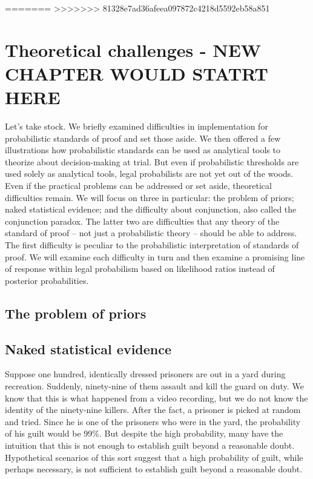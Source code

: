 \documentclass[10pt,dvipsnames,enabledeprecatedfontcommands]{scrartcl}
\begin{document}
=======
>>>>>>> 81328e7ad36afeea097872c4218d5592eb58a851
\hypertarget{theoretical-challenges---new-chapter-would-statrt-here}{%
\section{Theoretical challenges - NEW CHAPTER WOULD STATRT
HERE}\label{theoretical-challenges---new-chapter-would-statrt-here}}

Let's take stock. We briefly examined difficulties in implementation for
probabilistic standards of proof and set those aside. We then offered a
few illustrations how probabilistic standards can be used as analytical
tools to theorize about decision-making at trial. But even if
probabilistic thresholds are used solely as analytical tools, legal
probabilists are not yet out of the woods. Even if the practical
problems can be addressed or set aside, theoretical difficulties remain.
We will focus on three in particular: the problem of priors; naked
statistical evidence; and the difficulty about conjunction, also called
the conjunction paradox. The latter two are difficulties that any theory
of the standard of proof -- not just a probabilistic theory -- should be
able to address. The first difficulty is peculiar to the probabilistic
interpretation of standards of proof. We will examine each difficulty in
turn and then examine a promising line of response within legal
probabilism based on likelihood ratios instead of posterior
probabilities.

\hypertarget{the-problem-of-priors}{%
\subsection{The problem of priors}\label{the-problem-of-priors}}

\hypertarget{naked-statistical-evidence}{%
\subsection{Naked statistical
evidence}\label{naked-statistical-evidence}}

Suppose one hundred, identically dressed prisoners are out in a yard
during recreation. Suddenly, ninety-nine of them assault and kill the
guard on duty. We know that this is what happened from a video
recording, but we do not know the identity of the ninety-nine killers.
After the fact, a prisoner is picked at random and tried. Since he is
one of the prisoners who were in the yard, the probability of his guilt
would be 99\%. But despite the high probability, many have the intuition
that this is not enough to establish guilt beyond a reasonable doubt.
Hypothetical scenarios of this sort suggest that a high probability of
guilt, while perhaps necessary, is not sufficient to establish guilt
beyond a reasonable doubt.
\end{document}
